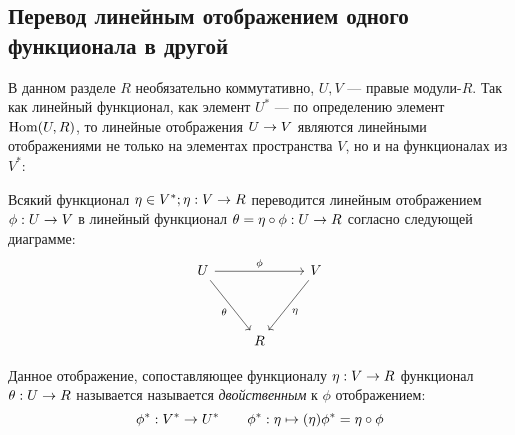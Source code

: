 \documentclass[a4paper]{report}
\begin{document}
    \subsection{Перевод линейным отображением одного функционала в другой}
    В данном разделе $R$ необязательно коммутативно, $U, V$ --- правые модули-$R$.
    Так как линейный функционал, как элемент $U^*$ --- по определению элемент $\operatorname{Hom}(U, R)$, то линейные отображения $U \rightarrow V$ являются линейными отображениями не только на элементах пространства $V$, но и на функционалах из $V^*$:

    Всякий функционал $\eta \in V^*; \eta: V \rightarrow R$ переводится линейным отображением $\phi: U \rightarrow V$ в линейный функционал $\theta = \eta \circ \phi: U \rightarrow R$ согласно следующей диаграмме:
    \[\begin{tikzcd}[ampersand replacement=\&]
    { U} \&\& { V} \\
    \\
    \& { R}
    \arrow["\phi", from=1-1, to=1-3]
    \arrow["\eta", from=1-3, to=3-2]
    \arrow["\theta"', from=1-1, to=3-2]
    \end{tikzcd}\]

    Данное отображение, сопоставляющее функционалу $\eta: V \rightarrow R$ функционал $\theta: U \rightarrow R$ называется называется \textit{двойственным} к $\phi$ отображением:
    \[\phi^*: V^* \rightarrow U^* \qquad \phi^*: \eta \mapsto (\eta)\phi^* = \eta \circ \phi\]
\end{document}
